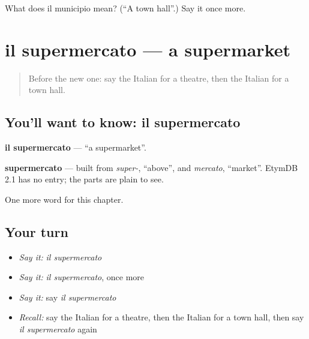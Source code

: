\begin{tcolorbox}[breakable,colback=teal!4,colframe=teal!35!black,title={Before you move on}]
What does il municipio mean? (\textquotedblleft{}A town hall\textquotedblright{}.) Say it once more.
\end{tcolorbox}
\section[il supermercato]{il supermercato — a supermarket}

\label{lesson:IT-C88-supermercato}



\begin{quote}
Before the new one: say the Italian for a theatre, then the Italian for a town hall.
\end{quote}

\subsection*{You'll want to know: il supermercato}
\textbf{il supermercato} — \textquotedblleft{}a supermarket\textquotedblright{}.

\begin{cousinweb}
\textbf{supermercato} — built from \emph{super-}, \textquotedblleft{}above\textquotedblright{}, and \emph{mercato}, \textquotedblleft{}market\textquotedblright{}. EtymDB 2.1 has no entry; the parts are plain to see.
\end{cousinweb}

\begin{grammarlens}[title={What you've built}]
One more word for this chapter.
\end{grammarlens}

\subsection*{Your turn}
\begin{itemize}
\raggedright
  \item \emph{Say it:} \emph{il supermercato}
  \item \emph{Say it:} \emph{il supermercato}, once more
  \item \emph{Say it:} say \emph{il supermercato}
  \item \emph{Recall:} say the Italian for a theatre, then the Italian for a town hall, then say \emph{il supermercato} again
\end{itemize}

